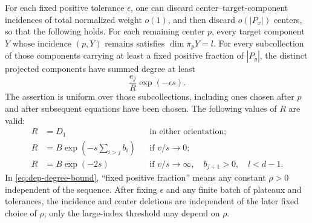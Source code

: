 \begin{proposition}
\label{prop:dep-projected-degree}
For each fixed positive tolerance $\epsilon$, one can discard center--target-component incidences of total normalized weight $o(1)$, and then discard $o(|P_x|)$ centers, so that the following holds. For each remaining center $p$, every target component $Y$ whose incidence $(p,Y)$ remains satisfies $\dim\overline{\pi_pY}=l$. For every subcollection of those components carrying at least a fixed positive fraction of $|P_y|$, the distinct projected components have summed degree at least
\begin{equation}\label{eq:dep-degree-bound}
 \frac{e_j}{R}\exp(-\epsilon s).
\end{equation}
The assertion is uniform over those subcollections, including ones chosen after $p$ and after subsequent equations have been chosen. The following values of $R$ are valid:
\begin{align}
 R&=D_1 &&\text{in either orientation};
       \label{eq:dep-first-R}\\
 R&=B\exp\left(-s\sum_{i>j}b_i\right)
       &&\text{if }v/s\longrightarrow0;
       \label{eq:dep-narrow-R}\\
 R&=B\exp(-2s)
       &&\text{if }v/s\longrightarrow\infty,
          \quad b_{j+1}>0,\quad l<d-1.
       \label{eq:dep-wide-R}
\end{align}
In \eqref{eq:dep-degree-bound}, ``fixed positive fraction'' means any constant $\rho>0$ independent of the sequence. After fixing $\epsilon$ and any finite batch of plateaux and tolerances, the incidence and center deletions are independent of the later fixed choice of $\rho$; only the large-index threshold may depend on $\rho$.
\end{proposition}

